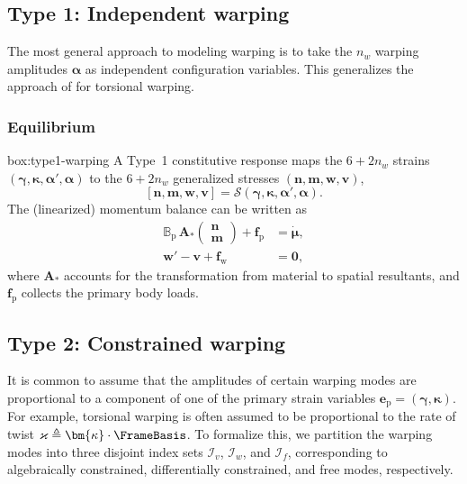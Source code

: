\subsection{Type 1: Independent warping}

The most general approach to modeling warping is to take the $n_w$ warping amplitudes $\bm{\alpha}$ as independent configuration variables.
This generalizes the approach of \cite{reissner1952nonuniform} for torsional warping.

\subsubsection{Equilibrium}

\vspace{1ex}
\begin{ambox}{box:type1-warping}
A Type~1 constitutive response maps the $6+2n_w$ strains $(\bm{\gamma},\bm{\kappa},\bm{\alpha}',\bm{\alpha})$ to the $6+2n_w$ generalized stresses $(\bm{n},\bm{m},\bm{w},\bm{v})$,
\[
  [\bm{n},\bm{m},\bm{w},\bm{v}]
    = \mathcal{S}(\bm{\gamma},\bm{\kappa},\bm{\alpha}',\bm{\alpha}).
\]
The (linearized) momentum balance can be written as
\begin{equation*}
  \begin{aligned}
    \mathbb{B}_{\mathrm{p}}\,\bm{A}_*
      \begin{pmatrix} \bm{n} \\ \bm{m} \end{pmatrix}
      + \bm{f}_{\mathrm{p}}
      &= \dot{\bm{\mu}},
    \\
    \bm{w}' - \bm{v} + \bm{f}_{\mathrm{w}}
      &= \mathbf{0},
  \end{aligned}
\end{equation*}
where $\bm{A}_*$ accounts for the transformation from material to spatial resultants, and $\bm{f}_{\mathrm{p}}$ collects the primary body loads.
\end{ambox}

\subsection{Type 2: Constrained warping}

It is common to assume that the amplitudes of certain warping modes are proportional to a component of one of the primary strain variables $\bm{e}_{\mathrm{p}} = (\bm{\gamma},\bm{\kappa})$.
For example, torsional warping is often assumed to be proportional to the rate of twist
$\varkappa \triangleq \bm{\kappa}\cdot\FrameBasis$.
To formalize this, we partition the warping modes into three disjoint index sets
$\mathcal{I}_v$, $\mathcal{I}_w$, and $\mathcal{I}_f$, corresponding to algebraically constrained, differentially constrained, and free modes, respectively.

